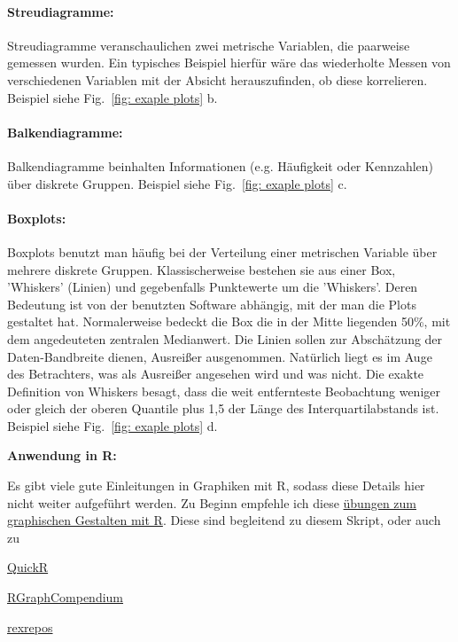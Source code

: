 \documentclass[a4paper,twoside]{tufte-book}\usepackage[]{graphicx}\usepackage[]{color}
\begin{document}
\paragraph{Streudiagramme:} Streudiagramme veranschaulichen zwei metrische Variablen, die paarweise gemessen wurden. Ein typisches Beispiel hierfür wäre das wiederholte Messen von verschiedenen Variablen mit der Absicht herauszufinden, ob diese korrelieren. Beispiel siehe Fig.~\ref{fig: exaple plots} b.

\paragraph{Balkendiagramme:} Balkendiagramme beinhalten Informationen (e.g. Häufigkeit oder Kennzahlen) über diskrete Gruppen. Beispiel siehe Fig.~\ref{fig: exaple plots} c.

\paragraph{Boxplots:} Boxplots benutzt man häufig bei der Verteilung einer metrischen Variable über mehrere diskrete Gruppen. Klassischerweise bestehen sie aus einer Box, 'Whiskers' (Linien) und gegebenfalls Punktewerte um die 'Whiskers'. Deren Bedeutung ist von der benutzten Software abhängig, mit der man die Plots gestaltet hat. Normalerweise bedeckt die Box die in der Mitte liegenden 50\%, mit dem angedeuteten zentralen Medianwert. Die Linien sollen zur Abschätzung der Daten-Bandbreite dienen, Ausreißer ausgenommen. Natürlich liegt es im Auge des Betrachters, was als Ausreißer angesehen wird und was nicht. Die exakte Definition von Whiskers besagt, dass die weit entfernteste Beobachtung weniger oder gleich der oberen Quantile plus 1,5 der Länge des Interquartilabstands ist. Beispiel siehe Fig.~\ref{fig: exaple plots} d.

\vspace{1cm}
\begin{fullwidth}
\begin{mdframed}[backgroundcolor=black!10,rightline=false,leftline=false]
    
\textbf{Anwendung in R:} 

Es gibt viele gute Einleitungen in Graphiken mit R, sodass diese Details hier nicht weiter aufgeführt werden. Zu Beginn empfehle ich diese  \href{https://github.com/florianhartig/ResearchSkills/tree/master/Labs/Statistics/Practicals/GraphicsInR}{übungen zum graphischen Gestalten mit R}. Diese sind begleitend zu diesem Skript, oder auch zu

\begin{itemize*}
  \item \href{http://www.statmethods.net/graphs/index.html}{QuickR}
  \item \href{http://shinyapps.org/apps/RGraphCompendium/index.php}{RGraphCompendium}
  \item \href{http://www.uni-kiel.de/psychologie/rexrepos/rerDiagrams.html}{rexrepos}
\end{itemize*}

\end{mdframed}
\end{fullwidth} 
\end{document}
